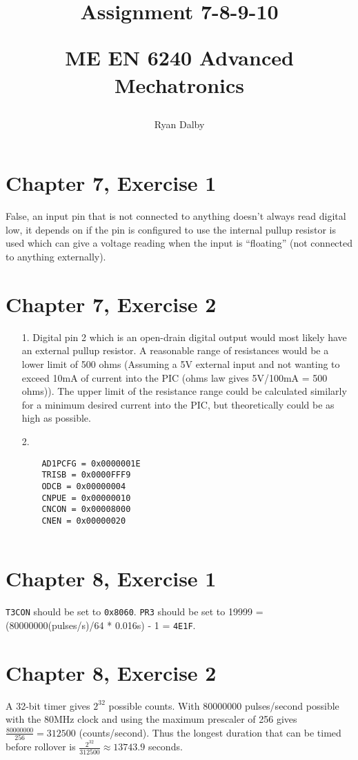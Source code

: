 \documentclass[12pt]{article}
\title{
    Assignment 7-8-9-10 

    \large{
        ME EN 6240 Advanced Mechatronics
    }  
}
\author{
        Ryan Dalby
}
\date{\displaydate{date}}
\begin{document}
\maketitle

\section*{Chapter 7, Exercise 1}
False, an input pin that is not connected to anything doesn't always read digital low, it depends on if the pin is configured to use the internal pullup resistor is used which can give a voltage reading when the input is ``floating'' (not connected to anything externally).

\section*{Chapter 7, Exercise 2}
\begin{itemize}
    \item [1.]
    Digital pin 2 which is an open-drain digital output would most likely have an external pullup resistor.
    A reasonable range of resistances would be a lower limit of 500 ohms (Assuming a 5V external input and not wanting to exceed 10mA of current into the PIC (ohms law gives 5V/100mA = 500 ohms)).
    The upper limit of the resistance range could be calculated similarly for a minimum desired current into the PIC, but theoretically could be as high as possible.

    \item [2.]
    \begin{verbatim}
    AD1PCFG = 0x0000001E
    TRISB = 0x0000FFF9
    ODCB = 0x00000004
    CNPUE = 0x00000010
    CNCON = 0x00008000
    CNEN = 0x00000020
        
    \end{verbatim}
\end{itemize}

\section*{Chapter 8, Exercise 1}
\verb|T3CON| should be set to \verb|0x8060|.
\verb|PR3| should be set to 19999 = (80000000(pulses/s)/64 * 0.016s) - 1 = \verb|4E1F|.

\section*{Chapter 8, Exercise 2}
A 32-bit timer gives $2^{32}$ possible counts.
With 80000000 pulses/second possible with the 80MHz clock and using the maximum prescaler of 256 gives $\frac{80000000}{256} = 312500$ (counts/second).
Thus the longest duration that can be timed before rollover is $\frac{2^{32}}{312500} \approx 13743.9$ seconds.
\end{document}
